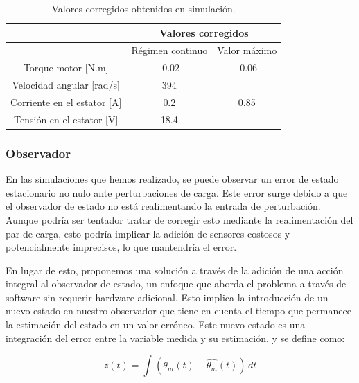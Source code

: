 \documentclass{article}
\begin{document}
\begin{table}[H]
    \begin{center}
    \begin{tabular}{|c|c|c|}
        \hline
         & \multicolumn{2}{c|}{Valores corregidos} \\
        \hline
          & Régimen continuo & Valor máximo \\
        \hline
        Torque motor [N.m]  & -0.02 & -0.06 \\
        \hline
        Velocidad angular [rad/s] & 394 &  \\
        \hline
        Corriente en el estator [A] & 0.2 & 0.85 \\
        \hline
        Tensión en el estator [V]  & 18.4 &\\
        \hline
    \end{tabular}
\end{center}
\caption{Valores corregidos obtenidos en simulación.}
\end{table}


\subsubsection{Observador}

En las simulaciones que hemos realizado, se puede observar un error de estado estacionario no nulo 
ante perturbaciones de carga. Este error surge debido a que el observador de estado no está 
realimentando la entrada de perturbación. Aunque podría ser tentador tratar de corregir esto 
mediante la realimentación del par de carga, esto podría implicar la adición de sensores costosos 
y potencialmente imprecisos, lo que mantendría el error.

En lugar de esto, proponemos una solución a través de la adición de una acción integral al 
observador de estado, un enfoque que aborda el problema a través de software sin requerir hardware 
adicional. Esto implica la introducción de un nuevo estado en nuestro observador que tiene en 
cuenta el tiempo que permanece la estimación del estado en un valor erróneo. Este nuevo estado es 
una integración del error entre la variable medida y su estimación, y se define como:

\begin{equation}
    z(t) = \int (\theta_m(t) - \hat{\theta_m}(t))\,dt
\end{equation}
\end{document}
